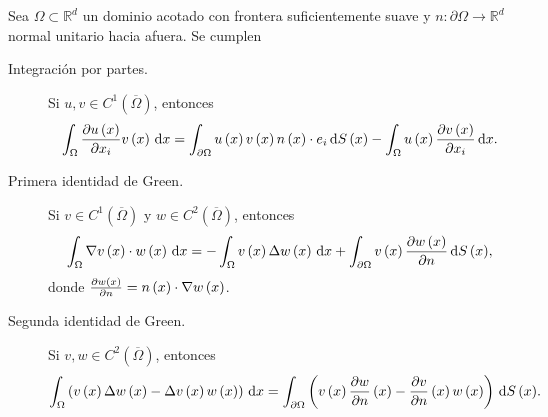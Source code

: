 \begin{theorem}
    Sea
    \begin{math}
        \Omega\subset
        \mathbb{R}^{d}
    \end{math}
    un dominio acotado con frontera suficientemente suave
    y
    \begin{math}
        n\colon
        \partial\Omega\to
        \mathbb{R}^{d}
    \end{math}
    normal unitario hacia afuera.
    Se cumplen
    \begin{description}
        \item[Integración por partes.]

            Si $u,v\in C^{1}\left(\overline{\Omega}\right)$, entonces
            \begin{equation*}
                \int_{\Omega}\diffp{u\left(x\right)}{x_{i}}
                v\left(x\right)\dl x=
                \int_{\partial\Omega}
                u\left(x\right)
                v\left(x\right)
                n\left(x\right)\cdot
                e_{i}
                \dl{S\left(x\right)}-
                \int_{\Omega}u\left(x\right)
                \diffp{v\left(x\right)}{x_{i}}
                \dl x.
            \end{equation*}

        \item[Primera identidad de Green.]
            Si $v\in C^{1}\left(\overline{\Omega}\right)$ y
            $w\in C^{2}\left(\overline{\Omega}\right)$, entonces
            \begin{equation*}
                \int_{\Omega}\nabla v\left(x\right)\cdot
                w\left(x\right)\dl x=
                -\int_{\Omega}
                v\left(x\right)
                \Delta w\left(x\right)
                \dl x+
                \int_{\partial\Omega}
                v\left(x\right)
                \diffp{w\left(x\right)}{n}
                \dl{S\left(x\right)},
            \end{equation*}
            donde
            \begin{math}
                \diffp{w\left(x\right)}{n}=
                n\left(x\right)\cdot
                \nabla w\left(x\right)
            \end{math}.

        \item[Segunda identidad de Green.]

            Si $v,w\in C^{2}\left(\overline{\Omega}\right)$, entonces
            \begin{equation*}
                \int_{\Omega}
                \left(
                v\left(x\right)
                \Delta w\left(x\right)-
                \Delta v\left(x\right)
                w\left(x\right)
                \right)
                \dl x=
                \int_{\partial\Omega}
                \left(
                v\left(x\right)
                \diffp{w}{n}\left(x\right)-
                \diffp{v}{n}\left(x\right)
                w\left(x\right)
                \right)
                \dl{S\left(x\right)}.
            \end{equation*}


\end{description}
\end{theorem}
